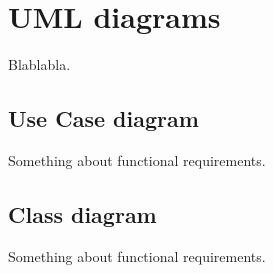 \chapter{UML diagrams}
Blablabla.

\section{Use Case diagram}
Something about functional requirements.

\section{Class diagram}
Something about functional requirements.

